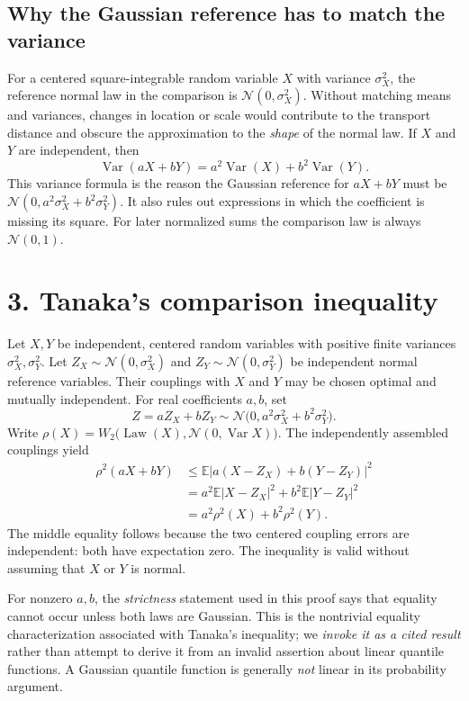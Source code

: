 \documentclass[10pt,a4paper]{article}
\newcommand{\Law}{\operatorname{Law}}
\newcommand{\E}{\mathbb E}
\newcommand{\Var}{\operatorname{Var}}
\newcommand{\N}{\mathcal N}
\newcommand{\W}{W_2}
\begin{document}
\subsection*{Why the Gaussian reference has to match the variance}
For a centered square-integrable random variable $X$ with variance $\sigma_X^2$, the reference normal law in the comparison is $\N(0,\sigma_X^2)$. Without matching means and variances, changes in location or scale would contribute to the transport distance and obscure the approximation to the \emph{shape} of the normal law. If $X$ and $Y$ are independent, then
\[
\Var(aX+bY)=a^2\Var(X)+b^2\Var(Y).
\]
This variance formula is the reason the Gaussian reference for $aX+bY$ must be $\N(0,a^2\sigma_X^2+b^2\sigma_Y^2)$. It also rules out expressions in which the coefficient is missing its square. For later normalized sums the comparison law is always $\N(0,1)$.

\section*{3. Tanaka's comparison inequality}
Let $X,Y$ be independent, centered random variables with positive finite variances $\sigma_X^2,\sigma_Y^2$. Let $Z_X\sim\N(0,\sigma_X^2)$ and $Z_Y\sim\N(0,\sigma_Y^2)$ be independent normal reference variables. Their couplings with $X$ and $Y$ may be chosen optimal and mutually independent. For real coefficients $a,b$, set
\[
Z=aZ_X+bZ_Y\sim\N\bigl(0,a^2\sigma_X^2+b^2\sigma_Y^2\bigr).
\]
Write $\rho(X)=\W\bigl(\Law(X),\N(0,\Var X)\bigr)$. The independently assembled couplings yield
\begin{align*}
\rho^2(aX+bY)
&\le \E\bigl|a(X-Z_X)+b(Y-Z_Y)\bigr|^2\\
&=a^2\E|X-Z_X|^2+b^2\E|Y-Z_Y|^2\\
&=a^2\rho^2(X)+b^2\rho^2(Y).
\end{align*}
The middle equality follows because the two centered coupling errors are independent: both have expectation zero. The inequality is valid without assuming that $X$ or $Y$ is normal.

For nonzero $a,b$, the \emph{strictness} statement used in this proof says that equality cannot occur unless both laws are Gaussian. This is the nontrivial equality characterization associated with Tanaka's inequality; we \emph{invoke it as a cited result} rather than attempt to derive it from an invalid assertion about linear quantile functions. A Gaussian quantile function is generally \emph{not} linear in its probability argument.
\end{document}
